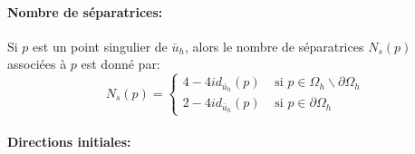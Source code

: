 \paragraph{Nombre de séparatrices:} Si $p$ est un point singulier de $\bar{u}_h$, alors le nombre de séparatrices $N_s(p)$ associées à $p$ est donné par:
\begin{equation}
    N_s(p) = 
    \left\{
    \begin{array}{ll}
    4-4id_{\bar{u}_h}(p) & \mbox{ si } p\in\Omega_h\backslash\partial\Omega_h\\[0.3cm]
    2-4id_{\bar{u}_h}(p) & \mbox{ si } p\in\partial\Omega_h
    \end{array}
    \right.
\end{equation}

\paragraph{Directions initiales:}

